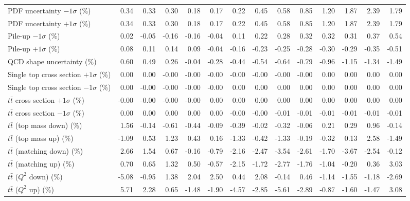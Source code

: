 \begin{table}[htbp]
{\begin{tabular}{lrrrrrrrrrrrrr}
PDF uncertainty $-1\sigma$ (\%) & 0.34 & 0.33 & 0.30 & 0.18 & 0.17 & 0.22 & 0.45 & 0.58 & 0.85 & 1.20 & 1.87 & 2.39 & 1.79 \\ 
PDF uncertainty $+1\sigma$ (\%) & 0.34 & 0.33 & 0.30 & 0.18 & 0.17 & 0.22 & 0.45 & 0.58 & 0.85 & 1.20 & 1.87 & 2.39 & 1.79 \\ 
Pile-up $-1\sigma$ (\%) & 0.02 & -0.05 & -0.16 & -0.16 & -0.04 & 0.11 & 0.22 & 0.28 & 0.32 & 0.32 & 0.31 & 0.37 & 0.54 \\ 
Pile-up $+1\sigma$ (\%) & 0.08 & 0.11 & 0.14 & 0.09 & -0.04 & -0.16 & -0.23 & -0.25 & -0.28 & -0.30 & -0.29 & -0.35 & -0.51 \\ 
QCD shape uncertainty (\%) & 0.60 & 0.49 & 0.26 & -0.04 & -0.28 & -0.44 & -0.54 & -0.64 & -0.79 & -0.96 & -1.15 & -1.34 & -1.49 \\ 
Single top cross section $+1\sigma$ (\%) & 0.00 & 0.00 & -0.00 & -0.00 & -0.00 & -0.00 & -0.00 & -0.00 & -0.00 & 0.00 & 0.00 & 0.00 & 0.00 \\ 
Single top cross section $-1\sigma$ (\%) & 0.00 & -0.00 & -0.00 & -0.00 & -0.00 & 0.00 & 0.00 & 0.00 & 0.00 & 0.00 & 0.00 & 0.00 & 0.00 \\ 
$t\bar{t}$ cross section $+1\sigma$ (\%) & -0.00 & -0.00 & -0.00 & -0.00 & 0.00 & 0.00 & 0.00 & 0.00 & 0.00 & 0.00 & 0.00 & 0.00 & 0.00 \\ 
$t\bar{t}$ cross section $-1\sigma$ (\%) & 0.00 & 0.00 & 0.00 & 0.00 & 0.00 & -0.00 & -0.00 & -0.01 & -0.01 & -0.01 & -0.01 & -0.01 & -0.01 \\ 
$t\bar{t}$ (top mass down) (\%) & 1.56 & -0.14 & -0.61 & -0.44 & -0.09 & -0.39 & -0.02 & -0.32 & -0.06 & 0.21 & 0.29 & 0.96 & -0.14 \\ 
$t\bar{t}$ (top mass up) (\%) & -1.09 & 0.53 & 1.23 & 0.43 & 0.16 & -1.33 & -0.42 & -1.33 & -0.19 & -0.32 & 0.13 & 2.58 & -1.49 \\ 
$t\bar{t}$ (matching down) (\%) & 2.66 & 1.54 & 0.67 & -0.16 & -0.79 & -2.16 & -2.47 & -3.54 & -2.61 & -1.70 & -3.67 & -2.54 & -0.12 \\ 
$t\bar{t}$ (matching up) (\%) & 0.70 & 0.65 & 1.32 & 0.50 & -0.57 & -2.15 & -1.72 & -2.77 & -1.76 & -1.04 & -0.20 & 0.36 & 3.03 \\ 
$t\bar{t}$ ($Q^{2}$ down) (\%) & -5.08 & -0.95 & 1.38 & 2.04 & 2.50 & 0.44 & 2.08 & -0.14 & 0.46 & -1.14 & -1.55 & -1.18 & -2.69 \\ 
$t\bar{t}$ ($Q^{2}$ up) (\%) & 5.71 & 2.28 & 0.65 & -1.48 & -1.90 & -4.57 & -2.85 & -5.61 & -2.89 & -0.87 & -1.60 & -1.47 & 3.08 \\ 

\end{tabular}}
\end{table}
